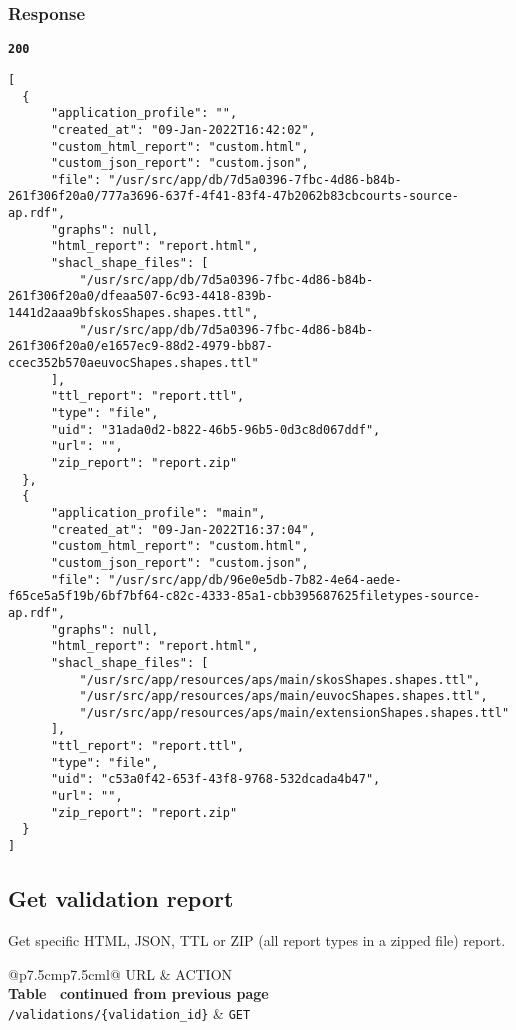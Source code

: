 \subsubsection{Response}
\textbf{\texttt{200}}
\begin{lstlisting}
[
  {
      "application_profile": "",
      "created_at": "09-Jan-2022T16:42:02",
      "custom_html_report": "custom.html",
      "custom_json_report": "custom.json",
      "file": "/usr/src/app/db/7d5a0396-7fbc-4d86-b84b-261f306f20a0/777a3696-637f-4f41-83f4-47b2062b83cbcourts-source-ap.rdf",
      "graphs": null,
      "html_report": "report.html",
      "shacl_shape_files": [
          "/usr/src/app/db/7d5a0396-7fbc-4d86-b84b-261f306f20a0/dfeaa507-6c93-4418-839b-1441d2aaa9bfskosShapes.shapes.ttl",
          "/usr/src/app/db/7d5a0396-7fbc-4d86-b84b-261f306f20a0/e1657ec9-88d2-4979-bb87-ccec352b570aeuvocShapes.shapes.ttl"
      ],
      "ttl_report": "report.ttl",
      "type": "file",
      "uid": "31ada0d2-b822-46b5-96b5-0d3c8d067ddf",
      "url": "",
      "zip_report": "report.zip"
  },
  {
      "application_profile": "main",
      "created_at": "09-Jan-2022T16:37:04",
      "custom_html_report": "custom.html",
      "custom_json_report": "custom.json",
      "file": "/usr/src/app/db/96e0e5db-7b82-4e64-aede-f65ce5a5f19b/6bf7bf64-c82c-4333-85a1-cbb395687625filetypes-source-ap.rdf",
      "graphs": null,
      "html_report": "report.html",
      "shacl_shape_files": [
          "/usr/src/app/resources/aps/main/skosShapes.shapes.ttl",
          "/usr/src/app/resources/aps/main/euvocShapes.shapes.ttl",
          "/usr/src/app/resources/aps/main/extensionShapes.shapes.ttl"
      ],
      "ttl_report": "report.ttl",
      "type": "file",
      "uid": "c53a0f42-653f-43f8-9768-532dcada4b47",
      "url": "",
      "zip_report": "report.zip"
  }
]
\end{lstlisting}

\subsection{Get validation report}
Get specific HTML, JSON, TTL or ZIP (all report types in a zipped file) report.

\begin{longtable}[c]{@{}p{7.5cm}p{7.5cm}l@{}}
  \toprule
  URL                                      & ACTION           \\* \midrule
  \endfirsthead
  \multicolumn{3}{c}%
  {{\bfseries Table \thetable\ continued from previous page}} \\
  \endhead
  \bottomrule
  \endfoot
  \endlastfoot
  \texttt{/validations/\{validation\_id\}} & \texttt{GET}     \\* \bottomrule
  \label{tab:rdf-validator-get-validation-report}             \\
\end{longtable}

